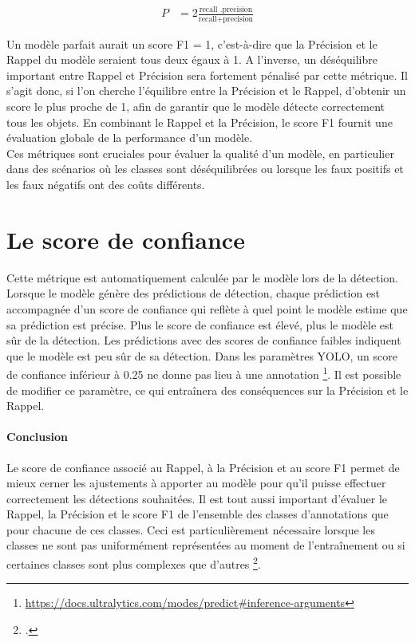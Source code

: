 \documentclass[12pt,twoside]{book}
\begin{document}
\begin{center}
    \begin{align*}
    P &= 2 \frac{\text{recall .precision}}{\text{recall+precision}}
    \end{align*}
\end{center}

Un modèle parfait aurait un score F1 = 1, c’est-à-dire que la Précision et le Rappel du modèle seraient tous deux égaux à 1. A l’inverse, un déséquilibre important entre Rappel et Précision sera fortement pénalisé par cette métrique. Il s’agit donc, si l’on cherche l’équilibre entre la Précision et le Rappel, d’obtenir un score le plus proche de 1, afin de garantir que le modèle détecte correctement tous les objets. En combinant le Rappel et la Précision, le score F1 fournit une évaluation globale de la performance d'un modèle. \\

Ces métriques sont cruciales pour évaluer la qualité d'un modèle, en particulier dans des scénarios où les classes sont déséquilibrées ou lorsque les faux positifs et les faux négatifs ont des coûts différents.

\section[Le score de confiance]{Le score de confiance}

Cette métrique est automatiquement calculée par le modèle lors de la détection. Lorsque le modèle génère des prédictions de détection, chaque prédiction est accompagnée d'un score de confiance qui reflète à quel point le modèle estime que sa prédiction est précise. Plus le score de confiance est élevé, plus le modèle est sûr de la détection. Les prédictions avec des scores de confiance faibles indiquent que le modèle est peu sûr de sa détection. Dans les paramètres YOLO, un score de confiance inférieur à 0.25 ne donne pas lieu à une annotation \footnote{\url{https://docs.ultralytics.com/modes/predict\#inference-arguments}}. Il est possible de modifier ce paramètre, ce qui entraînera des conséquences sur la Précision et le Rappel. \\

\paragraph{Conclusion}Le score de confiance associé au Rappel, à la Précision et au score F1 permet de mieux cerner les ajustements à apporter au modèle pour qu’il puisse effectuer correctement les détections souhaitées. Il est tout aussi important d’évaluer le Rappel, la Précision et le score F1 de l’ensemble des classes d’annotations que pour chacune de ces classes. Ceci est particulièrement nécessaire lorsque les classes ne sont pas uniformément représentées au moment de l’entraînement ou si certaines classes sont plus complexes que d’autres \footcite[46]{hutchison_dataset_2006}.
\end{document}
